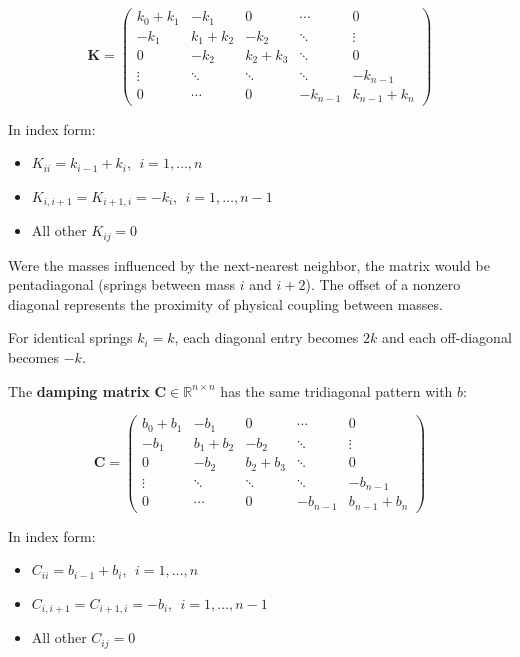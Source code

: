 \documentclass[
  letterpaper,
  DIV=11,
  numbers=noendperiod]{scrartcl}
\providecommand{\tightlist}{%
  \setlength{\itemsep}{0pt}\setlength{\parskip}{0pt}}
\begin{document}
\[\mathbf{K} = \begin{pmatrix} k_0 + k_1 & -k_1 & 0 & \cdots & 0 \\ -k_1 & k_1 + k_2 & -k_2 & \ddots & \vdots \\ 0 & -k_2 & k_2 + k_3 & \ddots & 0 \\ \vdots & \ddots & \ddots & \ddots & -k_{n-1} \\ 0 & \cdots & 0 & -k_{n-1} & k_{n-1} + k_n \end{pmatrix}\]

In index form:

\begin{itemize}
\tightlist
\item
  \(K_{ii} = k_{i-1} + k_i\), \(\;i = 1, \ldots, n\)
\item
  \(K_{i,i+1} = K_{i+1,i} = -k_i\), \(\;i = 1, \ldots, n-1\)
\item
  All other \(K_{ij} = 0\)
\end{itemize}

Were the masses influenced by the next-nearest neighbor, the matrix
would be pentadiagonal (springs between mass \(i\) and \(i+2\)). The
offset of a nonzero diagonal represents the proximity of physical
coupling between masses.

For identical springs \(k_i = k\), each diagonal entry becomes \(2k\)
and each off-diagonal becomes \(-k\).

The \textbf{damping matrix} \(\mathbf{C} \in \mathbb{R}^{n \times n}\)
has the same tridiagonal pattern with \(b\):

\[\mathbf{C} = \begin{pmatrix} b_0 + b_1 & -b_1 & 0 & \cdots & 0 \\ -b_1 & b_1 + b_2 & -b_2 & \ddots & \vdots \\ 0 & -b_2 & b_2 + b_3 & \ddots & 0 \\ \vdots & \ddots & \ddots & \ddots & -b_{n-1} \\ 0 & \cdots & 0 & -b_{n-1} & b_{n-1} + b_n \end{pmatrix}\]

In index form:

\begin{itemize}
\tightlist
\item
  \(C_{ii} = b_{i-1} + b_i\), \(\;i = 1, \ldots, n\)
\item
  \(C_{i,i+1} = C_{i+1,i} = -b_i\), \(\;i = 1, \ldots, n-1\)
\item
  All other \(C_{ij} = 0\)
\end{itemize}
\end{document}
